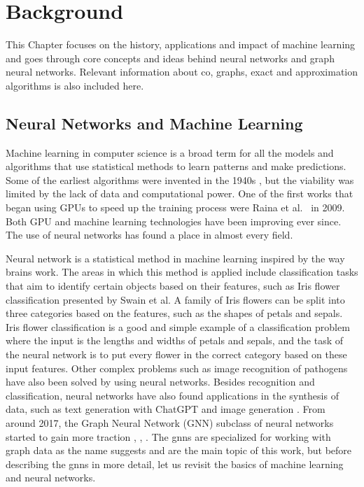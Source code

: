 \chapter{Background}
\label{sec:background}

This Chapter focuses on the history, applications and impact of machine learning and goes through core concepts and ideas behind neural networks and graph neural networks. Relevant information about \gls{co}, graphs, exact and approximation algorithms is also included here.

\section{Neural Networks and Machine Learning}

Machine learning in computer science is a broad term for all the models and algorithms that use statistical methods to learn patterns and make predictions. Some of the earliest algorithms were invented in the 1940s \cite{mlhist}, but the viability was limited by the lack of data and computational power. One of the first works that began using GPUs to speed up the training process were Raina et al.\ \cite{fistgpuuse} in 2009. Both GPU and machine learning technologies have been improving ever since. The use of neural networks has found a place in almost every field. 

Neural network is a statistical method in machine learning inspired by the way brains work. The areas in which this method is applied include classification tasks that aim to identify certain objects based on their features, such as Iris flower classification \cite{swain2012approach} presented by Swain et al. A family of Iris flowers can be split into three categories based on the features, such as the shapes of petals and sepals. Iris flower classification is a good and simple example of a classification problem where the input is the lengths and widths of petals and sepals, and the task of the neural network is to put every flower in the correct category based on these input features. Other complex problems such as image recognition of pathogens \cite{TRAORE2018257} have also been solved by using neural networks. Besides recognition and classification, neural networks have also found applications in the synthesis of data, such as text generation with ChatGPT \cite{RAY2023121} and image generation \cite{Liao2022CVPR}. From around 2017, the Graph Neural Network (GNN) subclass of neural networks started to gain more traction \cite{hamilton2018inductive}, \cite{velickovic2018graph}, \cite{kipf2017semisupervised}. The \gls{gnn}s are specialized for working with graph data as the name suggests and are the main topic of this work, but before describing the \gls{gnn}s in more detail, let us revisit the basics of machine learning and neural networks.

